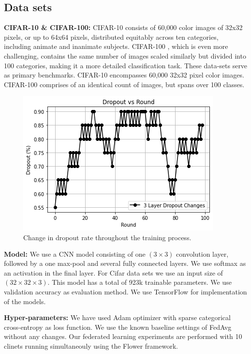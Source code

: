 \documentclass{article}
\begin{document}
\subsection{Data sets}

\textbf{CIFAR-10 \& CIFAR-100: }CIFAR-10 \cite{krizhevsky2009learning} consists of 60,000 color images of 32x32 pixels, or up to 64x64 pixels, distributed equitably across ten categories, including animate and inanimate subjects. CIFAR-100 \cite{singla2021improved}, which is even more challenging, contains the same number of images scaled similarly but divided into 100 categories, making it a more detailed classification task. These data-sets serve as primary benchmarks. CIFAR-10 encompasses 60,000 32x32 pixel color images. CIFAR-100 comprises of an identical count of images, but spans over 100 classes.

\begin{figure}
  \centering
\includegraphics[width = .5\linewidth, height = .4\linewidth]{img/Drop_Round.png}
\caption{Change in dropout rate throughout the training process.}
  \label{fig:drop}
\end{figure}

\textbf{Model: }We use a CNN model consisting of one $(3 \times 3)$ convolution layer, followed by a one max-pool and several fully connected layers. We use softmax as an activation in the final layer. For Cifar data sets we use an input size of $(32 \times 32 \times 3)$. This model has a total of 923k trainable parameters. We use validation accuracy as evaluation method. We use TensorFlow for implementation of the models.

\textbf{Hyper-parameters: } We have used Adam optimizer with sparse categorical cross-entropy as loss function. We use the known baseline settings of FedAvg without any changes. Our federated learning experiments are performed with 10 clinets running simultaneouly using the Flower framework.
\end{document}
